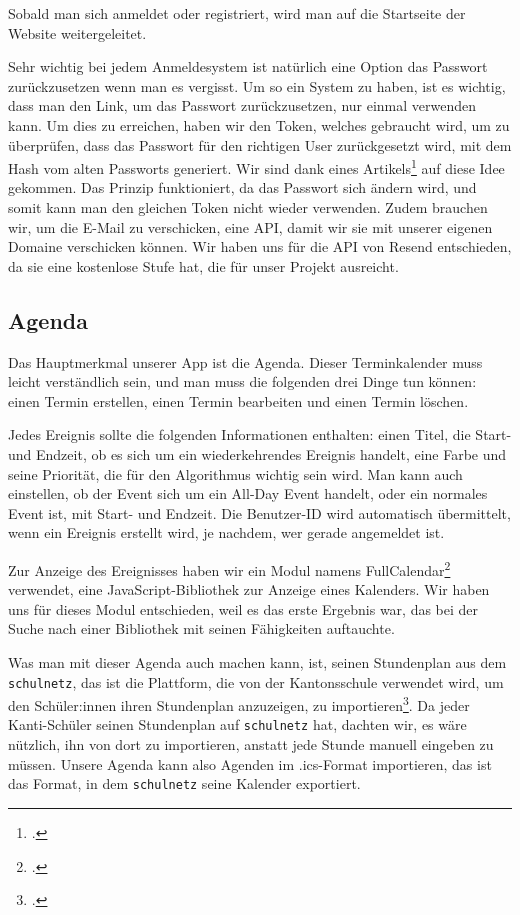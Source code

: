 \documentclass[12pt,a4paper]{report}
\begin{document}
Sobald man sich anmeldet oder registriert, wird man auf die Startseite der Website weitergeleitet.

Sehr wichtig bei jedem Anmeldesystem ist natürlich eine Option das Passwort zurückzusetzen wenn man es vergisst. Um so ein System zu haben, ist es wichtig, dass man den Link, um das Passwort zurückzusetzen, nur einmal verwenden kann. Um dies zu erreichen, haben wir den Token, welches gebraucht wird, um zu überprüfen, dass das Passwort für den richtigen User zurückgesetzt wird, mit dem Hash vom alten Passworts generiert. Wir sind dank eines Artikels\footcite{password_reset} auf diese Idee gekommen. Das Prinzip funktioniert, da das Passwort sich ändern wird, und somit kann man den gleichen Token nicht wieder verwenden. Zudem brauchen wir, um die E-Mail zu verschicken, eine API, damit wir sie mit unserer eigenen Domaine verschicken können. Wir haben uns für die API von Resend entschieden, da sie eine kostenlose Stufe hat, die für unser Projekt ausreicht.

\subsection{Agenda}
Das Hauptmerkmal unserer App ist die Agenda. Dieser Terminkalender muss leicht verständlich sein, und man muss die folgenden drei Dinge tun können: einen Termin erstellen, einen Termin bearbeiten und einen Termin löschen.

Jedes Ereignis sollte die folgenden Informationen enthalten: einen Titel, die Start- und Endzeit, ob es sich um ein wiederkehrendes Ereignis handelt, eine Farbe und seine Priorität, die für den Algorithmus wichtig sein wird. Man kann auch einstellen, ob der Event sich um ein All-Day Event handelt, oder ein normales Event ist, mit Start- und Endzeit. Die Benutzer-ID wird automatisch übermittelt, wenn ein Ereignis erstellt wird, je nachdem, wer gerade angemeldet ist.

Zur Anzeige des Ereignisses haben wir ein Modul namens FullCalendar\footcite{full_calendar} verwendet, eine JavaScript-Bibliothek zur Anzeige eines Kalenders. Wir haben uns für dieses Modul entschieden, weil es das erste Ergebnis war, das bei der Suche nach einer Bibliothek mit seinen Fähigkeiten auftauchte. 

Was man mit dieser Agenda auch machen kann, ist, seinen Stundenplan aus dem \texttt{schulnetz}, das ist die Plattform, die von der Kantonsschule verwendet wird, um den Schüler:innen ihren Stundenplan anzuzeigen, zu importieren\footcite{icalendar}. Da jeder Kanti-Schüler seinen Stundenplan auf \texttt{schulnetz} hat, dachten wir, es wäre nützlich, ihn von dort zu importieren, anstatt jede Stunde manuell eingeben zu müssen. Unsere Agenda kann also Agenden im .ics-Format importieren, das ist das Format, in dem \texttt{schulnetz} seine Kalender exportiert.
\end{document}
